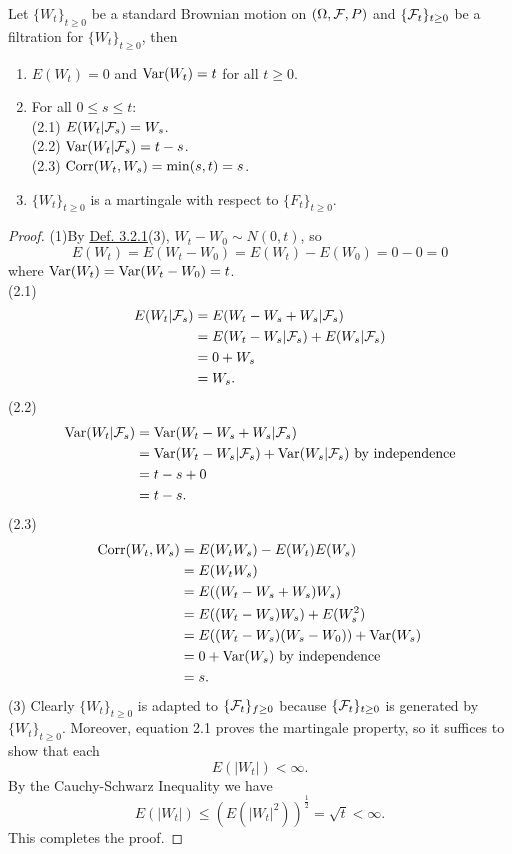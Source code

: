 \documentclass[11pt,fleqn]{book} %
\begin{document}
\begin{proposition} \label{prop:3212}
Let \(\{W_t\}_{t\geq0}\) be a standard Brownian motion on \((\Omega, \mathcal{F}, P)\) and \(\{\mathcal{F}_t\}_{t\geq0}\) be a filtration for \(\{W_t\}_{t\geq0}\), then
\begin{enumerate}
\item \(E(W_t) = 0\) and \(\operatorname{Var}(W_t) = t\) for all \(t \geq 0\).
\item For all \(0 \leq s \leq t\): \\
(2.1) \(E(W_t|\mathcal{F}_s) = W_s\). \\
(2.2) \(\operatorname{Var}(W_t|\mathcal{F}_s) = t - s\). \\
(2.3) \(\operatorname{Corr}(W_t, W_s) = \min(s, t) = s\).
\item \(\{W_t\}_{t\geq0}\) is a martingale with respect to \(\{F_t\}_{t\geq0}\).
\end{enumerate}
\end{proposition}
\begin{proof}
(1)By \hyperref[def:321]{Def. 3.2.1}(3), \(W_t - W_0 \sim N(0, t)\), so
\[
E(W_t) = E(W_t - W_0) = E(W_t) - E(W_0) = 0 - 0 = 0
\]
where \(\operatorname{Var}(W_t) = \operatorname{Var}(W_t - W_0) = t\). \\
(2.1) \[
\begin{aligned}
E(W_t|\mathcal{F}_s) &= E(W_t - W_s + W_s | \mathcal{F}_s) \\
&= E(W_t - W_s|\mathcal{F}_s) + E(W_s|\mathcal{F}_s) \\
&= 0 + W_s \\
&= W_s.
\end{aligned}
\]
(2.2) \[
\begin{aligned}
\operatorname{Var}(W_t|\mathcal{F}_s) &= \operatorname{Var}(W_t - W_s + W_s|\mathcal{F}_s) \\
&= \operatorname{Var}(W_t - W_s | \mathcal{F}_s) + \operatorname{Var}(W_s|\mathcal{F}_s) \text{ by independence} \\
&= t - s + 0 \\
&= t - s.
\end{aligned}
\]
(2.3) \[
\begin{aligned}
\operatorname{Corr}(W_t, W_s) &= E(W_tW_s) - E(W_t)E(W_s) \\
&= E(W_tW_s) \\
&= E((W_t - W_s + W_s)W_s) \\
&= E((W_t - W_s)W_s) + E(W_s^2) \\
&= E((W_t - W_s)(W_s - W_0)) + \operatorname{Var}(W_s) \\
&= 0 + \operatorname{Var}(W_s) \text{ by independence} \\
&= s.
\end{aligned}
\]
(3) Clearly \(\{W_t\}_{t\geq0}\) is adapted to \(\{\mathcal{F}_t\}_{f\geq0}\) because \(\{\mathcal{F}_t\}_{t\geq0}\) is generated by \(\{W_t\}_{t\geq0}\). Moreover, equation 2.1 proves the martingale property, so it suffices to show that each
\[
E(|W_t|) < \infty.
\]
\indent By the Cauchy-Schwarz Inequality we have
\[
E(|W_t|) \leq \left(E(|W_t|^2)\right)^{\frac12} = \sqrt{t} < \infty.
\]
\indent This completes the proof.
\end{proof}
\end{document}
